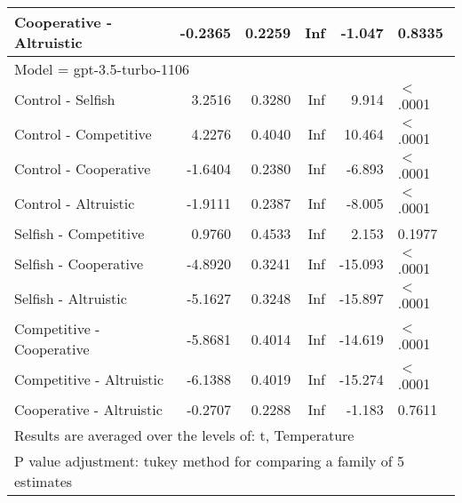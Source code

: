 \begin{table}[ht]
\begin{tabular}{lrrrrl}
  Cooperative - Altruistic & -0.2365 & 0.2259 & Inf & -1.047 & 0.8335 \\ 
   \hline
\multicolumn{6}{l}{Model = gpt-3.5-turbo-1106}\\
Control - Selfish & 3.2516 & 0.3280 & Inf & 9.914 & $<$.0001 \\ 
  Control - Competitive & 4.2276 & 0.4040 & Inf & 10.464 & $<$.0001 \\ 
  Control - Cooperative & -1.6404 & 0.2380 & Inf & -6.893 & $<$.0001 \\ 
  Control - Altruistic & -1.9111 & 0.2387 & Inf & -8.005 & $<$.0001 \\ 
  Selfish - Competitive & 0.9760 & 0.4533 & Inf & 2.153 & 0.1977 \\ 
  Selfish - Cooperative & -4.8920 & 0.3241 & Inf & -15.093 & $<$.0001 \\ 
  Selfish - Altruistic & -5.1627 & 0.3248 & Inf & -15.897 & $<$.0001 \\ 
  Competitive - Cooperative & -5.8681 & 0.4014 & Inf & -14.619 & $<$.0001 \\ 
  Competitive - Altruistic & -6.1388 & 0.4019 & Inf & -15.274 & $<$.0001 \\ 
  Cooperative - Altruistic & -0.2707 & 0.2288 & Inf & -1.183 & 0.7611 \\ 
   \hline
\multicolumn{6}{l}{{\footnotesize Results are averaged over the levels of: t, Temperature}}\\

\multicolumn{6}{l}{{\footnotesize P value adjustment: tukey method for comparing a family of 5 estimates}}\\
\end{tabular}
\end{table}

